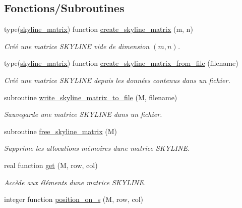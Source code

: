 \subsection*{Fonctions/\+Subroutines}
\begin{DoxyCompactItemize}
\item 
type(\hyperlink{structskyline_1_1skyline__matrix}{skyline\+\_\+matrix}) function \hyperlink{namespaceskyline_a5fe1d351df2e3a07f96028d1d2a892a8}{create\+\_\+skyline\+\_\+matrix} (m, n)
\begin{DoxyCompactList}\small\item\em Créé une matrice S\+K\+Y\+L\+I\+NE vide de dimension $(m,n)$. \end{DoxyCompactList}\item 
type(\hyperlink{structskyline_1_1skyline__matrix}{skyline\+\_\+matrix}) function \hyperlink{namespaceskyline_a86a4fe28bc106ef42d25cf7596c108bf}{create\+\_\+skyline\+\_\+matrix\+\_\+from\+\_\+file} (filename)
\begin{DoxyCompactList}\small\item\em Créé une matrice S\+K\+Y\+L\+I\+NE depuis les données contenus dans un fichier. \end{DoxyCompactList}\item 
subroutine \hyperlink{namespaceskyline_a3377a8391ad2d61659689fc8c4130bdc}{write\+\_\+skyline\+\_\+matrix\+\_\+to\+\_\+file} (M, filename)
\begin{DoxyCompactList}\small\item\em Sauvegarde une matrice S\+K\+Y\+L\+I\+NE dans un fichier. \end{DoxyCompactList}\item 
subroutine \hyperlink{namespaceskyline_a583c70b26e3bcb37ecb679f5c11ec2f4}{free\+\_\+skyline\+\_\+matrix} (M)
\begin{DoxyCompactList}\small\item\em Supprime les allocations mémoires d\textquotesingle{}une matrice S\+K\+Y\+L\+I\+NE. \end{DoxyCompactList}\item 
real function \hyperlink{namespaceskyline_a28077ec6714b830771f90da1b674b0ce}{get} (M, row, col)
\begin{DoxyCompactList}\small\item\em Accède aux éléments d\textquotesingle{}une matrice S\+K\+Y\+L\+I\+NE. \end{DoxyCompactList}\item 
integer function \hyperlink{namespaceskyline_a25b1e027d99abb67ab844d7b657a5843}{position\+\_\+on\+\_\+s} (M, row, col)

\end{DoxyCompactItemize}
